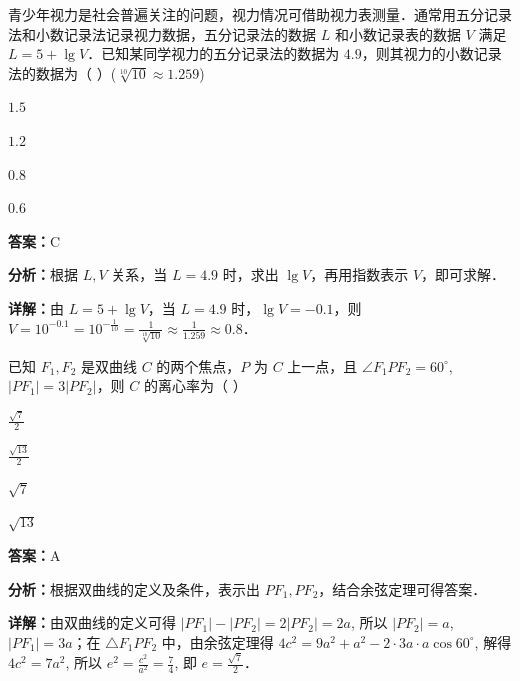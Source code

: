 \begin{question}[points=5]
青少年视力是社会普遍关注的问题，视力情况可借助视力表测量．通常用五分记录法和小数记录法记录视力数据，五分记录法的数据 $L$ 和小数记录表的数据 $V$ 满足 $L = 5 + \lg V$．已知某同学视力的五分记录法的数据为 $4.9$，则其视力的小数记录法的数据为（ ）($\sqrt[10]{10} \approx 1.259$)
\begin{choices}
  \item $1.5$
  \item $1.2$
  \item $0.8$
  \item $0.6$
\end{choices}
\begin{solution}
\textbf{答案：}C

\textbf{分析：}根据 $L,V$ 关系，当 $L=4.9$ 时，求出 $\lg V$，再用指数表示 $V$，即可求解．

\textbf{详解：}由 $L=5+\lg V$，当 $L=4.9$ 时，$\lg V = -0.1$，则 $V = 10^{-0.1} = 10^{-\frac{1}{10}} = \frac{1}{\sqrt[10]{10}} \approx \frac{1}{1.259} \approx 0.8$．
\end{solution}
\end{question}

\begin{question}[points=5]
已知 $F_1, F_2$ 是双曲线 $C$ 的两个焦点，$P$ 为 $C$ 上一点，且 $\angle F_1PF_2 = 60^\circ$, $|PF_1| = 3|PF_2|$，则 $C$ 的离心率为（ ）
\begin{choices}
  \item $\frac{\sqrt{7}}{2}$
  \item $\frac{\sqrt{13}}{2}$
  \item $\sqrt{7}$
  \item $\sqrt{13}$
\end{choices}
\begin{solution}
\textbf{答案：}A

\textbf{分析：}根据双曲线的定义及条件，表示出 $PF_1, PF_2$，结合余弦定理可得答案．

\textbf{详解：}由双曲线的定义可得 $|PF_1|-|PF_2| = 2|PF_2| = 2a$, 所以 $|PF_2| = a$, $|PF_1| = 3a$；在 $\triangle F_1PF_2$ 中，由余弦定理得 $4c^2 = 9a^2 + a^2 - 2\cdot 3a\cdot a\cos60^\circ$, 解得 $4c^2 = 7a^2$, 所以 $e^2 = \frac{c^2}{a^2} = \frac{7}{4}$, 即 $e = \frac{\sqrt{7}}{2}$．
\end{solution}
\end{question}

